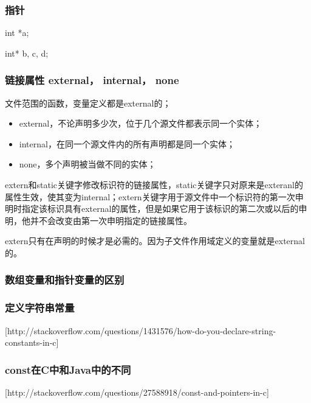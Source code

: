\subsubsection{指针}

\begin{C}[最好使用的写法是这样]
int *a;
\end{C}

\begin{C}
int* b, c, d;
\end{C}

\subsubsection{链接属性 external， internal， none}

文件范围的函数，变量定义都是external的；

\begin{itemize}
\item external，不论声明多少次，位于几个源文件都表示同一个实体；
\item internal，在同一个源文件内的所有声明都是同一个实体；
\item none，多个声明被当做不同的实体；
\end{itemize}

extern和static关键字修改标识符的链接属性，static关键字只对原来是exteranl的属性生效，使其变为internal；extern关键字用于源文件中一个标识符的第一次申明时指定该标识具有external的属性，但是如果它用于该标识的第二次或以后的申明，他并不会改变由第一次申明指定的链接属性。


extern只有在声明的时候才是必需的。因为子文件作用域定义的变量就是external的。

\subsubsection{数组变量和指针变量的区别}

\subsubsection{定义字符串常量}
[http://stackoverflow.com/questions/1431576/how-do-you-declare-string-constants-in-c]

\subsubsection{const在C中和Java中的不同}
[http://stackoverflow.com/questions/27588918/const-and-pointers-in-c]

